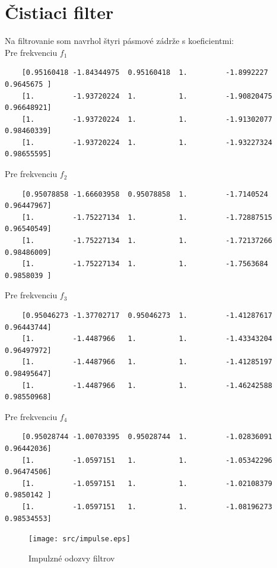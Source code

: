 \documentclass{article}
\begin{document}
  \section{Čistiaci filter}
  Na filtrovanie som navrhol štyri pásmové zádrže s koeficientmi: \\
  Pre frekvenciu $f_1$ \\
  \begin{verbatim}
    [0.95160418 -1.84344975  0.95160418  1.         -1.8992227   0.9645675 ] 
    [1.         -1.93720224  1.          1.         -1.90820475  0.96648921]
    [1.         -1.93720224  1.          1.         -1.91302077  0.98460339]
    [1.         -1.93720224  1.          1.         -1.93227324  0.98655595]
  \end{verbatim}
  Pre frekvenciu $f_2$ \\
  \begin{verbatim}
    [0.95078858 -1.66603958  0.95078858  1.         -1.7140524   0.96447967]
    [1.         -1.75227134  1.          1.         -1.72887515  0.96540549]
    [1.         -1.75227134  1.          1.         -1.72137266  0.98486009]
    [1.         -1.75227134  1.          1.         -1.7563684   0.9858039 ]
  \end{verbatim}
  Pre frekvenciu $f_3$ \\
  \begin{verbatim}
    [0.95046273 -1.37702717  0.95046273  1.         -1.41287617  0.96443744]
    [1.         -1.4487966   1.          1.         -1.43343204  0.96497972]
    [1.         -1.4487966   1.          1.         -1.41285197  0.98495647]
    [1.         -1.4487966   1.          1.         -1.46242588  0.98550968]
  \end{verbatim}
  Pre frekvenciu $f_4$ \\
  \begin{verbatim}
    [0.95028744 -1.00703395  0.95028744  1.         -1.02836091  0.96442036]
    [1.         -1.0597151   1.          1.         -1.05342296  0.96474506]
    [1.         -1.0597151   1.          1.         -1.02108379  0.9850142 ]
    [1.         -1.0597151   1.          1.         -1.08196273  0.98534553]
  \end{verbatim}


  \begin{figure}[H]
    \texttt{[image: src/impulse.eps]}
    \caption{Impulzné odozvy filtrov}
  \end{figure}
\end{document}
